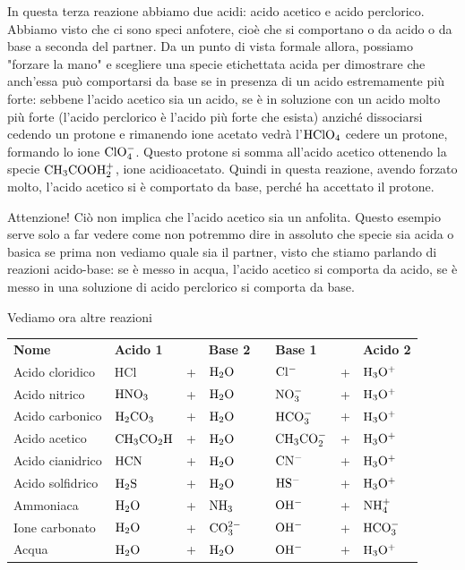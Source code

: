 \vspace{0.2cm}In questa terza reazione abbiamo due acidi: acido acetico e acido perclorico. Abbiamo visto che ci sono speci anfotere, cioè che si comportano o da acido o da base a seconda del partner. Da un punto di vista formale allora, possiamo "forzare la mano" e scegliere una specie etichettata acida per dimostrare che anch'essa può comportarsi da base se in presenza di un acido estremamente più forte: sebbene l'acido acetico sia un acido, se è in soluzione con un acido molto più forte (l'acido perclorico è l'acido più forte che esista) anziché dissociarsi cedendo un protone e rimanendo ione acetato vedrà l'$\rm HClO_4$ cedere un protone, formando lo ione $\rm ClO_4^-$. Questo protone si somma all'acido acetico ottenendo la specie $\rm CH_3COOH_2^+$, ione acidioacetato. Quindi in questa reazione, avendo forzato molto, l'acido acetico si è comportato da base, perché ha accettato il protone.

Attenzione! Ciò non implica che l'acido acetico sia un anfolita. Questo esempio serve solo a far vedere come non potremmo dire in assoluto che specie sia acida o basica se prima non vediamo quale sia il partner, visto che stiamo parlando di reazioni acido-base: se è messo in acqua, l'acido acetico si comporta da acido, se è messo in una soluzione di acido perclorico si comporta da base.

\vspace{0.2cm}Vediamo ora altre reazioni

\begin{center}
    \begin{tabular}{llllllll}
        \textbf{Nome} & \textbf{Acido 1} & & \textbf{Base 2} & & \textbf{Base 1} & & \textbf{Acido 2}\\[0.3ex]
        Acido cloridico & HCl & + & $\rm H_2O$ & \ce{<-->} & $\rm Cl^-$ & + & $\rm H_3O^+$\\[0.3ex]
        Acido nitrico & $\rm HNO_3$ & + & $\rm H_2O$ & \ce{<-->} & $\rm NO_3^-$ & + & $\rm H_3O^+$\\[0.3ex]
        Acido carbonico & $\rm H_2CO_3$ & + & $\rm H_2O$ & \ce{<-->} & $\rm HCO_3^-$ & + & $\rm H_3O^+$\\[0.3ex]
        Acido acetico & $\rm CH_3CO_2H$ & + & $\rm H_2O$ & \ce{<-->} & $\rm CH_3CO_2^-$ & + & $\rm H_3O^+$\\[0.3ex]
        Acido cianidrico & $\rm HCN$ & + & $\rm H_2O$ & \ce{<-->} & $\rm CN^-$ & + & $\rm H_3O^+$\\[0.3ex]
        Acido solfidrico & $\rm H_2S$ & + & $\rm H_2O$ & \ce{<-->} & $\rm HS^-$ & + & $\rm H_3O^+$\\[0.3ex]
        Ammoniaca & $\rm H_2O$ & + & $\rm NH_3$ & \ce{<-->} & $\rm OH^-$ & + & $\rm NH_4^+$\\[0.3ex]
        Ione carbonato & $\rm H_2O$ & + & $\rm CO_3^{2-}$ & \ce{<-->} & $\rm OH^-$ & + & $\rm HCO_3^-$\\[0.3ex]
        Acqua & $\rm H_2O$ & + & $\rm H_2O$ & \ce{<-->} & $\rm OH^-$ & + & $\rm H_3O^+$\\[0.3ex]
    \end{tabular}
\end{center}

